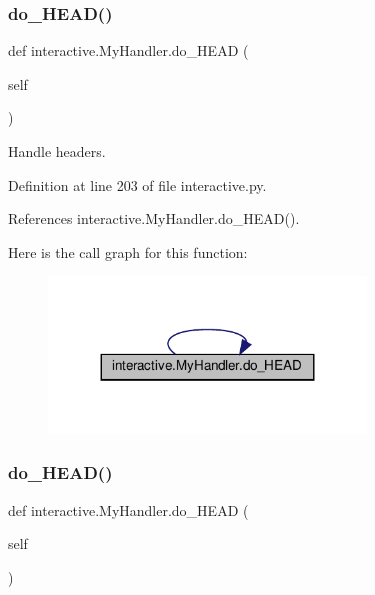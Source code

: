 \subsubsection{\texorpdfstring{do\+\_\+\+H\+E\+A\+D()}{do\_HEAD()}\hspace{0.1cm}{\footnotesize\ttfamily [1/2]}}
{\footnotesize\ttfamily def interactive.\+My\+Handler.\+do\+\_\+\+H\+E\+AD (\begin{DoxyParamCaption}\item[{}]{self }\end{DoxyParamCaption})}

\begin{DoxyVerb}Handle headers.\end{DoxyVerb}
 

Definition at line 203 of file interactive.\+py.



References interactive.\+My\+Handler.\+do\+\_\+\+H\+E\+A\+D().

Here is the call graph for this function\+:
\nopagebreak
\begin{figure}[H]
\begin{center}
\leavevmode
\includegraphics[width=239pt]{classinteractive_1_1MyHandler_a6255cc42ad4ffd494808bed1c0e2b3fb_cgraph}
\end{center}
\end{figure}
\mbox{\label{classinteractive_1_1MyHandler_a6255cc42ad4ffd494808bed1c0e2b3fb}} 
\subsubsection{\texorpdfstring{do\+\_\+\+H\+E\+A\+D()}{do\_HEAD()}\hspace{0.1cm}{\footnotesize\ttfamily [2/2]}}
{\footnotesize\ttfamily def interactive.\+My\+Handler.\+do\+\_\+\+H\+E\+AD (\begin{DoxyParamCaption}\item[{}]{self }\end{DoxyParamCaption})}

